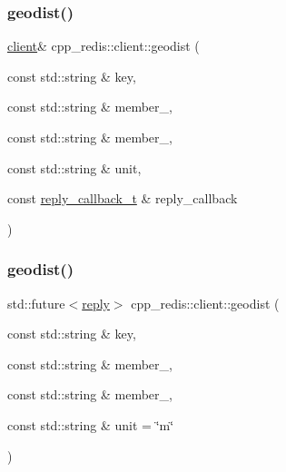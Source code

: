 \subsubsection{\texorpdfstring{geodist()}{geodist()}\hspace{0.1cm}{\footnotesize\ttfamily [2/3]}}
{\footnotesize\ttfamily \hyperlink{classcpp__redis_1_1client}{client}\& cpp\+\_\+redis\+::client\+::geodist (\begin{DoxyParamCaption}\item[{const std\+::string \&}]{key,  }\item[{const std\+::string \&}]{member\+\_,  }\item[{const std\+::string \&}]{member\+\_,  }\item[{const std\+::string \&}]{unit,  }\item[{const \hyperlink{classcpp__redis_1_1client_a061a1140d36d2eaeda82b09a0bb3f9f2}{reply\+\_\+callback\+\_\+t} \&}]{reply\+\_\+callback }\end{DoxyParamCaption})}

\mbox{\label{classcpp__redis_1_1client_a32c21dc5c2b8187c33e22e695c2f1555}} 
\subsubsection{\texorpdfstring{geodist()}{geodist()}\hspace{0.1cm}{\footnotesize\ttfamily [3/3]}}
{\footnotesize\ttfamily std\+::future$<$\hyperlink{classcpp__redis_1_1reply}{reply}$>$ cpp\+\_\+redis\+::client\+::geodist (\begin{DoxyParamCaption}\item[{const std\+::string \&}]{key,  }\item[{const std\+::string \&}]{member\+\_,  }\item[{const std\+::string \&}]{member\+\_,  }\item[{const std\+::string \&}]{unit = {\ttfamily \char`\"{}m\char`\"{}} }\end{DoxyParamCaption})}

\mbox{\label{classcpp__redis_1_1client_a37b20a863f276469d12dc47063d56055}} 
